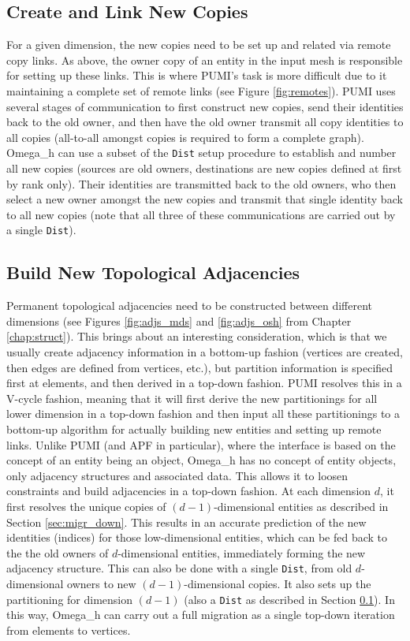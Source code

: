 \subsection{Create and Link New Copies}
\label{sec:migr_links}

For a given dimension, the new copies need to be set up
and related via remote copy links.
As above, the owner copy of an entity in the input mesh is responsible
for setting up these links.
This is where PUMI's task is more difficult due to it maintaining
a complete set of remote links (see Figure \ref{fig:remotes}).
PUMI uses several stages of communication to first construct
new copies, send their identities back to the old owner, and then
have the old owner transmit all copy identities to all copies (all-to-all
amongst copies is required to form a complete graph).
Omega\_h can use a subset of the \texttt{Dist} setup procedure
to establish and number all new copies (sources are old owners, destinations are
new copies defined at first by rank only).
Their identities are transmitted back to the old owners, who then
select a new owner amongst the new copies and transmit that single
identity back to all new copies (note that all three of these
communications are carried out by a single \texttt{Dist}).

\subsection{Build New Topological Adjacencies}
\label{sec:migr_topo}

Permanent topological adjacencies need to be constructed
between different dimensions (see Figures \ref{fig:adjs_mds} and
\ref{fig:adjs_osh} from Chapter \ref{chap:struct}).
This brings about an interesting consideration, which is that we
usually create adjacency information in a bottom-up fashion (vertices
are created, then edges are defined from vertices, etc.), but
partition information is specified first at elements, and then
derived in a top-down fashion.
PUMI resolves this in a V-cycle fashion, meaning that it will first
derive the new partitionings for all lower dimension in a top-down
fashion and then input all these partitionings to a bottom-up algorithm
for actually building new entities and setting up remote links.
Unlike PUMI (and APF in particular), where the interface is based on the
concept of an entity being an object, Omega\_h has no concept of entity
objects, only adjacency structures and associated data.
This allows it to loosen constraints and build adjacencies in a top-down fashion.
At each dimension $d$, it first resolves the unique copies of
$(d-1)$-dimensional entities as described in Section \ref{sec:migr_down}.
This results in an accurate prediction of the new identities (indices)
for those low-dimensional entities, which can be fed back to the
the old owners of $d$-dimensional entities, immediately forming
the new adjacency structure.
This can also be done with a single \texttt{Dist}, from old
$d$-dimensional owners to new $(d-1)$-dimensional copies.
It also sets up the partitioning for dimension $(d-1)$
(also a \texttt{Dist} as described in Section \ref{sec:migr_links}).
In this way, Omega\_h can carry out a full migration as a single
top-down iteration from elements to vertices.

